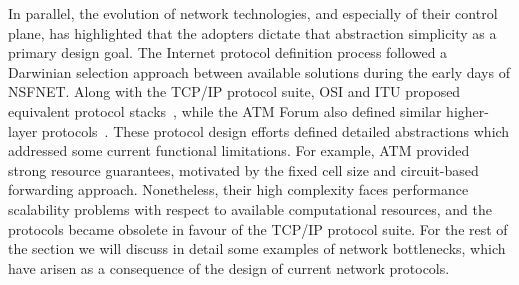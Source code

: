 In parallel, the evolution of network technologies, and especially of their
control plane, has highlighted that the adopters dictate that abstraction
simplicity as a primary design goal. The Internet protocol definition process
followed a Darwinian selection approach between available solutions during the
early days of NSFNET\@. Along with the TCP/IP protocol suite, OSI and ITU
proposed equivalent protocol stacks~, while the ATM Forum
also defined similar higher-layer protocols~. These protocol
design efforts defined detailed abstractions which addressed some current
functional limitations.  For example, ATM provided strong resource guarantees,
motivated by the fixed cell size and circuit-based forwarding approach.
Nonetheless, their high complexity faces performance scalability problems with
respect to available computational resources, and the protocols became obsolete
in favour of the TCP/IP protocol suite. For the rest of the section we will
discuss in detail some examples of network bottlenecks, which have arisen as a
consequence of the design of current network protocols.

